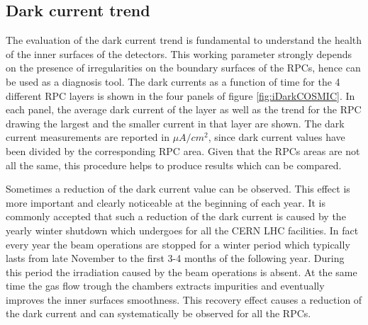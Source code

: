 \subsection{Dark current trend}
The evaluation of the dark current trend is fundamental to understand the health of the inner surfaces of the detectors.
This working parameter strongly depends on the presence of irregularities on the boundary surfaces of the RPCs, hence can be used as a diagnosis tool.
The dark currents as a function of time for the 4 different RPC layers is shown in the four panels of figure \ref{fig:iDarkCOSMIC}. 
In each panel, the average dark current of the layer as well as the trend for the RPC drawing the largest and the smaller current in that layer are shown.
The dark current measurements are reported in $\mu A/cm^2$, since dark current values have been divided by the corresponding RPC area.
Given that the RPCs areas are not all the same, this procedure helps to produce results which can be compared.


Sometimes a reduction of the dark current value can be observed.
This effect is more important and clearly noticeable at the beginning of each year.
It is commonly accepted that such a reduction of the dark current is caused by the yearly winter shutdown which undergoes for all the CERN LHC facilities.
In fact every year the beam operations are stopped for a winter period which typically lasts from late November to the first 3-4 months of the following year.
During this period the irradiation caused by the beam operations is absent.
At the same time the gas flow trough the chambers extracts impurities and eventually improves the inner surfaces smoothness.
This recovery effect causes a reduction of the dark current and can systematically be observed for all the RPCs.

